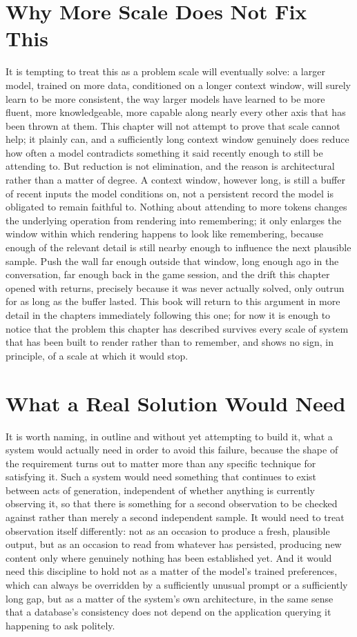 \section{Why More Scale Does Not Fix This}

It is tempting to treat this as a problem scale will eventually solve: a larger model, trained on more data, conditioned on a longer context window, will surely learn to be more consistent, the way larger models have learned to be more fluent, more knowledgeable, more capable along nearly every other axis that has been thrown at them. This chapter will not attempt to prove that scale cannot help; it plainly can, and a sufficiently long context window genuinely does reduce how often a model contradicts something it said recently enough to still be attending to. But reduction is not elimination, and the reason is architectural rather than a matter of degree. A context window, however long, is still a buffer of recent inputs the model conditions on, not a persistent record the model is obligated to remain faithful to. Nothing about attending to more tokens changes the underlying operation from rendering into remembering; it only enlarges the window within which rendering happens to look like remembering, because enough of the relevant detail is still nearby enough to influence the next plausible sample. Push the wall far enough outside that window, long enough ago in the conversation, far enough back in the game session, and the drift this chapter opened with returns, precisely because it was never actually solved, only outrun for as long as the buffer lasted. This book will return to this argument in more detail in the chapters immediately following this one; for now it is enough to notice that the problem this chapter has described survives every scale of system that has been built to render rather than to remember, and shows no sign, in principle, of a scale at which it would stop.

\section{What a Real Solution Would Need}

It is worth naming, in outline and without yet attempting to build it, what a system would actually need in order to avoid this failure, because the shape of the requirement turns out to matter more than any specific technique for satisfying it. Such a system would need something that continues to exist between acts of generation, independent of whether anything is currently observing it, so that there is something for a second observation to be checked against rather than merely a second independent sample. It would need to treat observation itself differently: not as an occasion to produce a fresh, plausible output, but as an occasion to read from whatever has persisted, producing new content only where genuinely nothing has been established yet. And it would need this discipline to hold not as a matter of the model's trained preferences, which can always be overridden by a sufficiently unusual prompt or a sufficiently long gap, but as a matter of the system's own architecture, in the same sense that a database's consistency does not depend on the application querying it happening to ask politely.

